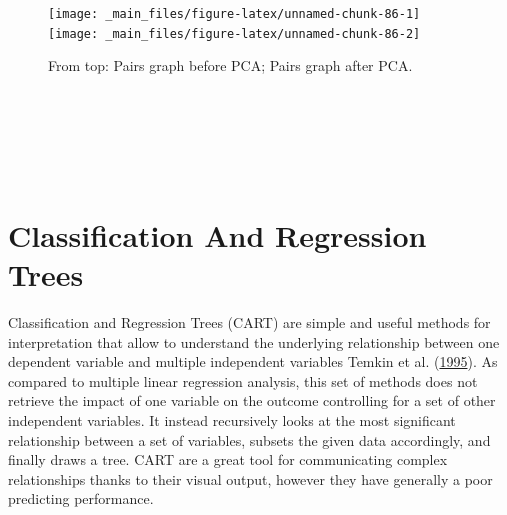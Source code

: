 \documentclass[
]{svmono}
\newenvironment{Shaded}{\begin{snugshade}}{\end{snugshade}}
\newcommand{\AttributeTok}[1]{\textcolor[rgb]{0.13,0.29,0.53}{#1}}
\newcommand{\CommentTok}[1]{\textcolor[rgb]{0.56,0.35,0.01}{\textit{#1}}}
\newcommand{\FunctionTok}[1]{\textcolor[rgb]{0.13,0.29,0.53}{\textbf{#1}}}
\newcommand{\NormalTok}[1]{#1}
\newcommand{\SpecialCharTok}[1]{\textcolor[rgb]{0.81,0.36,0.00}{\textbf{#1}}}
\newcommand{\StringTok}[1]{\textcolor[rgb]{0.31,0.60,0.02}{#1}}
\begin{document}
\begin{Shaded}
\end{Shaded}

\begin{figure}[H]
\texttt{[image: \_main\_files/figure-latex/unnamed-chunk-86-1]} \texttt{[image: \_main\_files/figure-latex/unnamed-chunk-86-2]} \caption{From top: Pairs graph before PCA; Pairs graph after PCA.}\label{fig:unnamed-chunk-86}
\end{figure}

~

~

~

\hypertarget{classification-and-regression-trees}{%
\section{Classification And Regression Trees}\label{classification-and-regression-trees}}

Classification and Regression Trees (CART) are simple and useful methods
for interpretation that allow to understand the underlying relationship
between one dependent variable and multiple independent variables
Temkin et al. (\protect\hyperlink{ref-temkin1995}{1995}). As compared to multiple linear regression
analysis, this set of methods does not retrieve the impact of one
variable on the outcome controlling for a set of other independent
variables. It instead recursively looks at the most significant
relationship between a set of variables, subsets the given data
accordingly, and finally draws a tree. CART are a great tool for
communicating complex relationships thanks to their visual output,
however they have generally a poor predicting performance.
\end{document}
